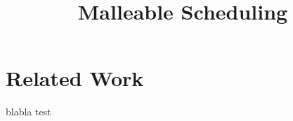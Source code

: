 \documentclass{article}
\author{}
\date{}
\title{Malleable Scheduling}
\begin{document}
    \maketitle
    \section{Related Work}

    blabla
	test
	
\end{document}
